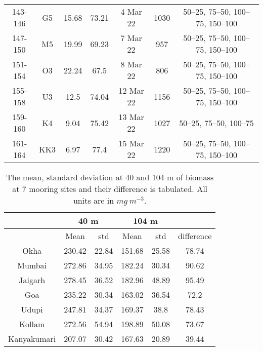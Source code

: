 \documentclass{article}
\begin{document}
\begin{table}[htbp]
{\begin{adjustwidth}{0in}{0in}
\begin{tabular}{ccccccc}
				143-146       & G5  & 15.68      & 73.21      & 4 Mar 22                  & 1030       & 50–25, 75–50, 100–75, 150–100 \\
				147-150       & M5  & 19.99      & 69.23      & 7 Mar 22                  & 957        & 50–25, 75–50, 100–75, 150–100 \\
				151-154       & O3  & 22.24      & 67.5       & 8 Mar 22                  & 806        & 50–25, 75–50, 100–75, 150–100 \\
				155-158       & U3  & 12.5       & 74.04      & 12 Mar 22                 & 1156       & 50–25, 75–50, 100–75, 150–100 \\
				159-160       & K4  & 9.04       & 75.42      & 13 Mar 22                 & 1027       & 50–25, 75–50, 100–75          \\
				161-164       & KK3 & 6.97       & 77.4       & 15 Mar 22                 & 1220       & 50–25, 75–50, 100–75, 150–100
				\\ 
				\bottomrule
			\end{tabular}
		\end{adjustwidth}
		\label{tab:table2}
	}
\end{table}

\begin{table}[t]
	
	{\footnotesize
		\captionsetup{justification=justified,font=footnotesize,skip=0.05\baselineskip,width=\textwidth} %
		\caption{\newline The mean, standard deviation at 40 and 104 m of biomass at 7 mooring sites and their difference is tabulated. All units are in $mg \ m^{-3}$.}
	\begin{adjustwidth}{0in}{0in} 
	\begin{tabular}{cccccc}
		& \multicolumn{2}{c}{40 m} & \multicolumn{2}{c}{104 m} &            \\ \hline
		& Mean        & std        & Mean         & std        & difference \\ \hline
		Okha        & 230.42      & 22.84      & 151.68       & 25.58      & 78.74      \\
		Mumbai      & 272.86      & 34.95      & 182.24       & 30.34      & 90.62      \\
		Jaigarh     & 278.45      & 36.52      & 182.96       & 48.89      & 95.49      \\
		Goa         & 235.22      & 30.34      & 163.02       & 36.54      & 72.2       \\
		Udupi       & 247.81      & 34.37      & 169.37       & 38.8       & 78.43      \\
		Kollam      & 272.56      & 54.94      & 198.89       & 50.08      & 73.67      \\
		Kanyakumari & 207.07      & 30.42      & 167.63       & 20.89      & 39.44  \\ \hline   
	\end{tabular}
	\end{adjustwidth}
    \label{tab:table3}
    }
\end{table}
\end{document}
